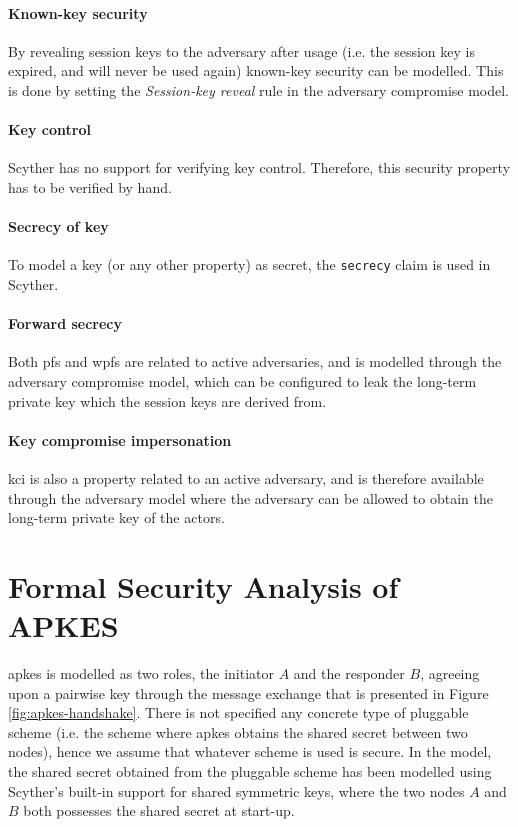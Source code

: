 \paragraph{Known-key security} By revealing session keys to the adversary after usage (i.e. the session key is expired, and will never be used again) known-key security can be modelled. This is done by setting the \emph{Session-key reveal} rule in the adversary compromise model.

\paragraph{Key control} Scyther has no support for verifying key control. Therefore, this security property has to be verified by hand. 

\paragraph{Secrecy of key} To model a key (or any other property) as secret, the \texttt{secrecy} claim is used in Scyther.

\paragraph{Forward secrecy} Both \gls{pfs} and \gls{wpfs} are related to active adversaries, and is modelled through the adversary compromise model, which can be configured to leak the long-term private key which the session keys are derived from.

\paragraph{Key compromise impersonation} \gls{kci} is also a property related to an active adversary, and is therefore available through the adversary model where the adversary can be allowed to obtain the long-term private key of the actors.


\section{Formal Security Analysis of APKES}

\gls{apkes} is modelled as two roles, the initiator $A$ and the responder $B$, agreeing upon a pairwise key through the message exchange that is presented in Figure \ref{fig:apkes-handshake}. There is not specified any concrete type of pluggable scheme (i.e. the scheme where \gls{apkes} obtains the shared secret between two nodes), hence we assume that whatever scheme is used is secure. In the model, the shared secret obtained from the pluggable scheme has been modelled using Scyther's built-in support for shared symmetric keys, where the two nodes $A$ and $B$ both possesses the shared secret at start-up.

